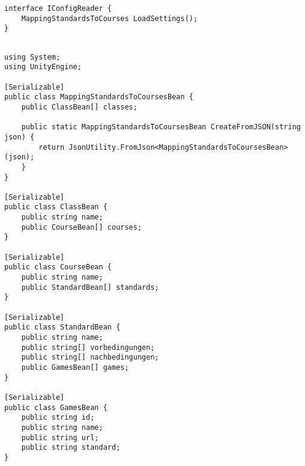 \begin{scriptsize}
				\lstset{
					float,
					caption=IConfigReader.cs, 
					language=[Sharp]C, 
					frame=single,  
					showstringspaces=false, 
					showspaces=false, 
					numbers=left, 
					captionpos=b, 
					belowcaptionskip=4pt,
					basicstyle=\ttfamily
				} 
				\begin{lstlisting}[label=lst:methode35]
interface IConfigReader {
    MappingStandardsToCourses LoadSettings();
}


				\end{lstlisting}
			\end{scriptsize}
			
\begin{scriptsize}
				\lstset{
					float,
					caption=MappingStandardsToCoursesBean.cs, 
					language=[Sharp]C, 
					frame=single,  
					showstringspaces=false, 
					showspaces=false, 
					numbers=left, 
					captionpos=b, 
					belowcaptionskip=4pt,
					basicstyle=\ttfamily
				} 
				\begin{lstlisting}[label=lst:methode3]
using System;
using UnityEngine;

[Serializable]
public class MappingStandardsToCoursesBean {
    public ClassBean[] classes;

    public static MappingStandardsToCoursesBean CreateFromJSON(string json) {
        return JsonUtility.FromJson<MappingStandardsToCoursesBean>(json);
    }
}

[Serializable]
public class ClassBean {
    public string name;
    public CourseBean[] courses;
}

[Serializable]
public class CourseBean {
    public string name;
    public StandardBean[] standards;
}

[Serializable]
public class StandardBean {
    public string name;
    public string[] vorbedingungen;
    public string[] nachbedingungen;
    public GamesBean[] games;
}

[Serializable]
public class GamesBean {
    public string id;
    public string name;
    public string url;
    public string standard;
}


				\end{lstlisting}
			\end{scriptsize}

